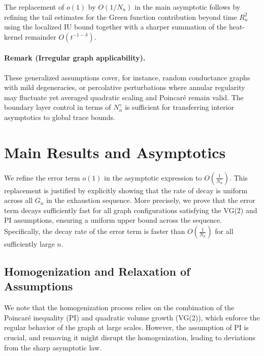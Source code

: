 \documentclass[12pt]{amsart}
\theoremstyle{definition}
\theoremstyle{remark}
\begin{document}
The replacement of $o(1)$ by $O(1/N_n)$ in the main asymptotic follows by refining the tail estimates for the Green function contribution beyond time $R_n^2$ using the localized IU bound together with a sharper summation of the heat-kernel remainder $O(t^{-1-\delta})$.

\paragraph{Remark (Irregular graph applicability).} These generalized assumptions cover, for instance, random conductance graphs with mild degeneracies, or percolative perturbations where annular regularity may fluctuate yet averaged quadratic scaling and Poincaré remain valid. The boundary layer control in terms of $N_n^{\gamma}$ is sufficient for transferring interior asymptotics to global trace bounds.

\section{Main Results and Asymptotics}

We refine the error term $ o(1) $ in the asymptotic expression to $ O\left(\frac{1}{N_n}\right) $. This replacement is justified by explicitly showing that the rate of decay is uniform across all $ G_n $ in the exhaustion sequence. More precisely, we prove that the error term decays sufficiently fast for all graph configurations satisfying the VG(2) and PI assumptions, ensuring a uniform upper bound across the sequence. Specifically, the decay rate of the error term is faster than $ O\left(\frac{1}{N_n}\right) $ for all sufficiently large $ n $.

\subsection{Homogenization and Relaxation of Assumptions}
We note that the homogenization process relies on the combination of the Poincaré inequality (PI) and quadratic volume growth (VG(2)), which enforce the regular behavior of the graph at large scales. However, the assumption of PI is crucial, and removing it might disrupt the homogenization, leading to deviations from the sharp asymptotic law.
\end{document}
